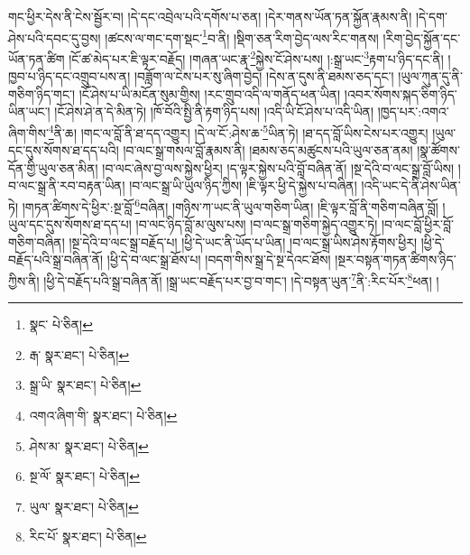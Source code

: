 གང་ཕྱིར་དེས་ནི་ངེས་སྦྱོར་བ། །དེ་དང་འབྲེལ་པའི་དགོས་པ་ཅན། །དེར་གནས་ཡོན་ཏན་སྐྱོན་རྣམས་ནི། །དེ་དག་ཤེས་པའི་དབང་དུ་བྱས། །ཚངས་ལ་གང་དག་སྡང་\footnote{སྣང་  པེ་ཅིན། }བ་ནི། །སྡིག་ཅན་རིག་བྱེད་ལས་རིང་གནས། །རིག་བྱེད་སྐྱོན་དང་ཡོན་ཏན་ཚིག །ངོ་ཚ་མེད་པར་ཇི་ལྟར་བརྗོད། །གཞན་ཡང་རྣ་\footnote{རྒ་  སྣར་ཐང་།  པེ་ཅིན། }སྐྱེས་ངོ་ཤེས་པས། །:སྒྲ་ཡང་\footnote{སྒྲ་ཡི་  སྣར་ཐང་།  པེ་ཅིན། }རྟག་པ་ཉིད་དང་ནི། །ཁྱབ་པ་ཉིད་དང་འགྲུབ་པས་ན། །བཟློག་ལ་ངེས་པར་སུ་ཞིག་བྱེད། །དེས་ན་དུས་ནི་ཐམས་ཅད་དང་། །ཡུལ་ཀུན་དུ་ནི་གཅིག་ཉིད་གང་། །ངོ་ཤེས་པ་ཡི་མངོན་སུམ་གྱིས། །རང་གྲུབ་འདི་ལ་གནོད་ཕན་ཡིན། །འབར་སོགས་སྐད་ཅིག་ཉིད་ཡིན་ཡང་། །ངོ་ཤེས་ཤེ་ན་དེ་མིན་ཏེ། །ཁོ་བོའི་སྤྱི་ནི་རྟག་ཉིད་པས། །འདི་ཡི་ངོ་ཤེས་པ་འདི་ཡིན། །ཁྱད་པར་:འགའ་ཞིག་གིས་\footnote{འགའ་ཞིག་གི་  སྣར་ཐང་།  པེ་ཅིན། }ནི་ཆ། །གང་ལ་བློ་ནི་ཐ་དད་འགྱུར། །དེ་ལ་ངོ་:ཤེས་ཆ་\footnote{ཤེས་མ་  སྣར་ཐང་།  པེ་ཅིན། }ཡིན་ཏེ། །ཐ་དད་བློ་ཡིས་ངེས་པར་འགྱུར། །ཡུལ་དང་དུས་སོགས་ཐ་དད་པའི། །བ་ལང་སྒྲ་གསལ་བློ་རྣམས་ནི། །ཐམས་ཅད་མཚུངས་པའི་ཡུལ་ཅན་ནམ། །སྣ་ཚོགས་དོན་གྱི་ཡུལ་ཅན་མིན། །བ་ལང་ཞེས་བྱ་ལས་སྐྱེས་ཕྱིར། །ད་ལྟར་སྐྱེས་པའི་བློ་བཞིན་ནོ། །སྔ་དེའི་བ་ལང་སྒྲ་བློ་ཡིས། །བ་ལང་སྒྲ་ནི་རབ་བརྟན་ཡིན། །བ་ལང་སྒྲ་ཡི་ཡུལ་ཉིད་ཀྱིས། །ཇི་ལྟར་ཕྱི་དེ་སྐྱེས་པ་བཞིན། །འདི་ཡང་དེ་ནི་ཤེས་ཡིན་ཏེ། །གཏན་ཚིགས་དེ་ཕྱིར་:སྔ་བློ་\footnote{སྔ་ལོ་  སྣར་ཐང་།  པེ་ཅིན། }བཞིན། །གཉིས་ཀ་ཡང་ནི་ཡུལ་གཅིག་ཡིན། །ཇི་ལྟར་བློ་ནི་གཅིག་བཞིན་བློ། །ཡུལ་དང་དུས་སོགས་ཐ་དད་པ། །བ་ལང་ཉིད་བློ་མ་ལུས་པས། །བ་ལང་སྒྲ་གཅིག་སྐྱེད་འགྱུར་ཏེ། །བ་ལང་བློ་ཕྱིར་བློ་གཅིག་བཞིན། །སྔ་དེའི་བ་ལང་སྒྲ་བརྗོད་པ། །ཕྱི་དེ་ཡང་ནི་ཡོད་པ་ཡིན། །བ་ལང་སྒྲ་ཡིས་ཤེས་རྟོགས་ཕྱིར། །ཕྱི་དེ་བརྗོད་པའི་སྒྲ་བཞིན་ནོ། །ཕྱི་དེ་བ་ལང་སྒྲ་ཐོས་པ། །བདག་གིས་སྒྲ་དེ་སྔ་དེའང་ཐོས། །སྔར་བསྟན་གཏན་ཚིགས་ཉིད་ཀྱིས་ནི། །ཕྱི་དེ་བརྗོད་པའི་སྒྲ་བཞིན་ནོ། །སྒྲ་ཡང་བརྗོད་པར་བྱ་བ་གང་། །དེ་བསྟན་ཡུན་\footnote{ཡུལ་  སྣར་ཐང་།  པེ་ཅིན། }ནི་:རིང་པོར་\footnote{རིང་པོ་  སྣར་ཐང་།  པེ་ཅིན། }ཕན། །
